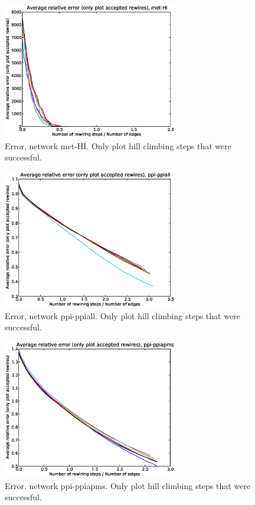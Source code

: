 \begin{figure}[p]
\centering
\includegraphics[width=3in]{Figures/acceptedOnly-met-HI.eps}
\caption{Error, network met-HI.  Only plot hill climbing steps that were successful.}
\label{fig:errors-met-HI}
\end{figure}

\begin{figure}[p]
\centering
\includegraphics[width=3in]{Figures/acceptedOnly-ppi-ppiall.eps}
\caption{Error, network ppi-ppiall.  Only plot hill climbing steps that were successful.}
\label{fig:errors-ppi-ppiall}
\end{figure}

\begin{figure}[p]
\centering
\includegraphics[width=3in]{Figures/acceptedOnly-ppi-ppiapms.eps}
\caption{Error, network ppi-ppiapms.  Only plot hill climbing steps that were successful.}
\label{fig:errors-ppi-ppiapms}
\end{figure}

